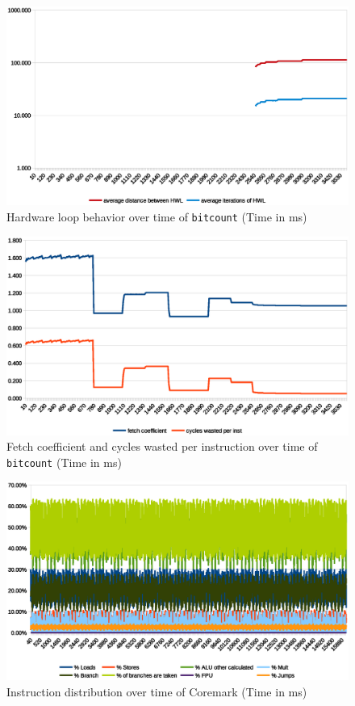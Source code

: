\documentclass[../bachelor_paper.tex]{subfiles}
\begin{document}
\begin{figure}
    \centering
    \includegraphics[width=\textwidth]{img/graph/mibench/bitcount_hwl.eps}
    \caption{Hardware loop behavior over time of \texttt{bitcount} (Time in ms)}
    \label{fig:res/bitcount/hwl}
\end{figure}

\begin{figure}
    \centering
    \includegraphics[width=\textwidth]{img/graph/mibench/bitcount_fetch_waste.eps}
    \caption{Fetch coefficient and cycles wasted per instruction over time of \texttt{bitcount} (Time in ms)}
    \label{fig:res/bitcount/fetch_waste}
\end{figure}

\begin{figure}
    \centering
    \includegraphics[width=\textwidth]{img/graph/coremark/coremark_inst.eps}
    \caption{Instruction distribution over time of Coremark (Time in ms)}
    \label{fig:res/coremark/inst}
\end{figure}
\end{document}

